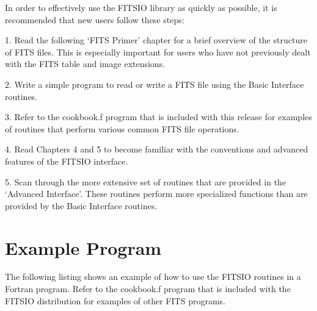 \documentclass[11pt]{book}
\begin{document}
In order to effectively use the FITSIO library as quickly as possible,
it is recommended that new users follow these steps:

1.  Read the following `FITS Primer' chapter for a brief
overview of the structure of FITS files.  This is especially important
for users who have not previously dealt with the FITS table and image
extensions.

2.  Write a simple program to read or write a FITS file using the Basic
Interface routines.

3.  Refer to the cookbook.f program that is included with this release
for examples of routines that perform various common FITS file
operations.

4. Read Chapters 4 and 5 to become familiar with the conventions and
advanced features of the FITSIO interface.

5.  Scan through the more extensive set of routines that are provided
in the `Advanced Interface'.  These routines perform more specialized
functions than are provided by the Basic Interface routines.


\section{Example Program}

The following listing shows an example of how to use the FITSIO
routines in a Fortran program.  Refer to the cookbook.f program that
is included with the FITSIO distribution for examples of other
FITS programs.
\end{document}
